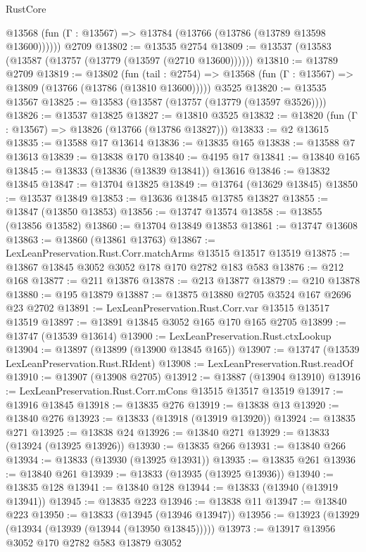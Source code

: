 \begin{lexlean}{RustCore}
\begin{coremodule}
      @13568 (fun (Γ : @13567) => @13784 (@13766 (@13786 (@13789 @13598 @13600))))))
    @2709
@13802 := @13535 @2754
@13809 := @13537 (@13583 (@13587 (@13757 (@13779 (@13597 (@2710 @13600))))))
@13810 := @13789 @2709
@13819 := @13802
    (fun (tail : @2754) => @13568 (fun (Γ : @13567) => @13809 (@13766 (@13786 (@13810 @13600)))))
    @3525
@13820 := @13535 @13567
@13825 := @13583 (@13587 (@13757 (@13779 (@13597 @3526))))
@13826 := @13537 @13825
@13827 := @13810 @3525
@13832 := @13820 (fun (Γ : @13567) => @13826 (@13766 (@13786 @13827)))
@13833 := @2 @13615
@13835 := @13588 @17 @13614
@13836 := @13835 @165
@13838 := @13588 @7 @13613
@13839 := @13838 @170
@13840 := @4195 @17
@13841 := @13840 @165
@13845 := @13833 (@13836 (@13839 @13841)) @13616
@13846 := @13832 @13845
@13847 := @13704 @13825
@13849 := @13764 (@13629 @13845)
@13850 := @13537 @13849
@13853 := @13636 @13845 @13785 @13827
@13855 := @13847 (@13850 @13853)
@13856 := @13747 @13574
@13858 := @13855 (@13856 @13582)
@13860 := @13704 @13849 @13853
@13861 := @13747 @13608
@13863 := @13860 (@13861 @13763)
@13867 := LexLeanPreservation.Rust.Corr.matchArms @13515 @13517 @13519
@13875 := @13867 @13845 @3052 @3052 @178 @170 @2782 @183 @583
@13876 := @212 @168
@13877 := @211 @13876
@13878 := @213 @13877
@13879 := @210 @13878
@13880 := @195 @13879
@13887 := @13875 @13880 @2705 @3524 @167 @2696 @23 @2702
@13891 := LexLeanPreservation.Rust.Corr.var @13515 @13517 @13519
@13897 := @13891 @13845 @3052 @165 @170 @165 @2705
@13899 := @13747 (@13539 @13614)
@13900 := LexLeanPreservation.Rust.ctxLookup
@13904 := @13897 (@13899 (@13900 @13845 @165))
@13907 := @13747 (@13539 LexLeanPreservation.Rust.RIdent)
@13908 := LexLeanPreservation.Rust.readOf
@13910 := @13907 (@13908 @2705)
@13912 := @13887 (@13904 @13910)
@13916 := LexLeanPreservation.Rust.Corr.mCons @13515 @13517 @13519
@13917 := @13916 @13845
@13918 := @13835 @276
@13919 := @13838 @13
@13920 := @13840 @276
@13923 := @13833 (@13918 (@13919 @13920))
@13924 := @13835 @271
@13925 := @13838 @24
@13926 := @13840 @271
@13929 := @13833 (@13924 (@13925 @13926))
@13930 := @13835 @266
@13931 := @13840 @266
@13934 := @13833 (@13930 (@13925 @13931))
@13935 := @13835 @261
@13936 := @13840 @261
@13939 := @13833 (@13935 (@13925 @13936))
@13940 := @13835 @128
@13941 := @13840 @128
@13944 := @13833 (@13940 (@13919 @13941))
@13945 := @13835 @223
@13946 := @13838 @11
@13947 := @13840 @223
@13950 := @13833 (@13945 (@13946 @13947))
@13956 := @13923 (@13929 (@13934 (@13939 (@13944 (@13950 @13845)))))
@13973 := @13917
    @13956
    @3052
    @170
    @2782
    @583
    @13879
    @3052

\end{coremodule}
\end{lexlean}
